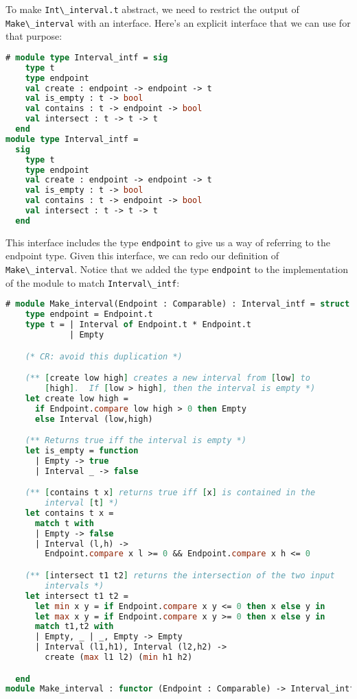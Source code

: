 To make \passthrough{\lstinline!Int\_interval.t!} abstract, we need to
restrict the output of \passthrough{\lstinline!Make\_interval!} with an
interface. Here's an explicit interface that we can use for that
purpose:

\begin{lstlisting}[language=Caml]
# module type Interval_intf = sig
    type t
    type endpoint
    val create : endpoint -> endpoint -> t
    val is_empty : t -> bool
    val contains : t -> endpoint -> bool
    val intersect : t -> t -> t
  end
module type Interval_intf =
  sig
    type t
    type endpoint
    val create : endpoint -> endpoint -> t
    val is_empty : t -> bool
    val contains : t -> endpoint -> bool
    val intersect : t -> t -> t
  end
\end{lstlisting}

This interface includes the type \passthrough{\lstinline!endpoint!} to
give us a way of referring to the endpoint type. Given this interface,
we can redo our definition of \passthrough{\lstinline!Make\_interval!}.
Notice that we added the type \passthrough{\lstinline!endpoint!} to the
implementation of the module to match
\passthrough{\lstinline!Interval\_intf!}:

\begin{lstlisting}[language=Caml]
# module Make_interval(Endpoint : Comparable) : Interval_intf = struct
    type endpoint = Endpoint.t
    type t = | Interval of Endpoint.t * Endpoint.t
             | Empty

    (* CR: avoid this duplication *)

    (** [create low high] creates a new interval from [low] to
        [high].  If [low > high], then the interval is empty *)
    let create low high =
      if Endpoint.compare low high > 0 then Empty
      else Interval (low,high)

    (** Returns true iff the interval is empty *)
    let is_empty = function
      | Empty -> true
      | Interval _ -> false

    (** [contains t x] returns true iff [x] is contained in the
        interval [t] *)
    let contains t x =
      match t with
      | Empty -> false
      | Interval (l,h) ->
        Endpoint.compare x l >= 0 && Endpoint.compare x h <= 0

    (** [intersect t1 t2] returns the intersection of the two input
        intervals *)
    let intersect t1 t2 =
      let min x y = if Endpoint.compare x y <= 0 then x else y in
      let max x y = if Endpoint.compare x y >= 0 then x else y in
      match t1,t2 with
      | Empty, _ | _, Empty -> Empty
      | Interval (l1,h1), Interval (l2,h2) ->
        create (max l1 l2) (min h1 h2)

  end
module Make_interval : functor (Endpoint : Comparable) -> Interval_intf
\end{lstlisting}

